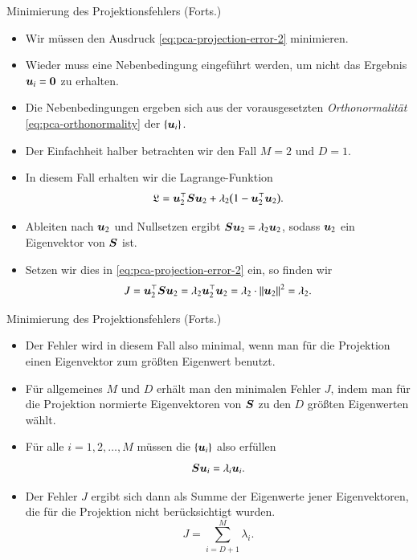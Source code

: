 \begin{frame}{Minimierung des Projektionsfehlers (Forts.)}{}
	\begin{itemize}
		\item Wir müssen den Ausdruck \eqref{eq:pca-projection-error-2} minimieren.
		\item Wieder muss eine Nebenbedingung eingeführt werden, um nicht das Ergebnis $\bm{u}_i = \bm{0}$ zu erhalten.
		\item Die Nebenbedingungen ergeben sich aus der vorausgesetzten \textit{Orthonormalität}
			\eqref{eq:pca-orthonormality} der $\{ \bm{u}_i \}$.
		\item Der Einfachheit halber betrachten wir den Fall $M = 2$ und $D = 1$.
		\item In diesem Fall erhalten wir die Lagrange-Funktion
		\begin{equation}
			\mathfrak{L} = \bm{u}_2^\top \bm{S} \bm{u}_2 + \lambda_2 \bigl( 1 - \bm{u}_2^\top \bm{u}_2 \bigr).
		\end{equation}
		\item Ableiten nach $\bm{u}_2$ und Nullsetzen ergibt $\bm{S} \bm{u}_2 = \lambda_2 \bm{u}_2$, sodass $\bm{u}_2$ ein Eigenvektor von $\bm{S}$ ist.
		\item Setzen wir dies in \eqref{eq:pca-projection-error-2} ein, so finden wir
		\begin{equation}
			J
				= \bm{u}_2^\top \bm{S} \bm{u}_2
				= \lambda_2 \bm{u}_2^\top \bm{u}_2
				= \lambda_2 \cdot \Vert \bm{u}_2 \Vert^2
				= \lambda_2.
		\end{equation}
	\end{itemize}
\end{frame}


\begin{frame}{Minimierung des Projektionsfehlers (Forts.)}{}
	\begin{itemize}
		\item Der Fehler wird in diesem Fall also minimal,
			wenn man für die Projektion einen Eigenvektor zum größten Eigenwert benutzt.
		\item Für allgemeines $M$ und $D$ erhält man den minimalen Fehler $J$, indem man für die Projektion normierte
		 	Eigenvektoren von $\bm{S}$ zu den $D$ größten Eigenwerten wählt.
		\item Für alle $i = 1, 2, \ldots, M$ müssen die $\{ \bm{u}_i \}$ also erfüllen
		\begin{equation}
			\bm{S} \bm{u}_i = \lambda_i \bm{u}_i.
		\end{equation}
		\item Der Fehler $J$ ergibt sich dann als Summe der Eigenwerte jener Eigenvektoren,
			die für die Projektion nicht berücksichtigt wurden.
		\begin{equation}
			J = \sum_{i=D+1}^M \lambda_i.
		\end{equation}
	\end{itemize}
\end{frame}
